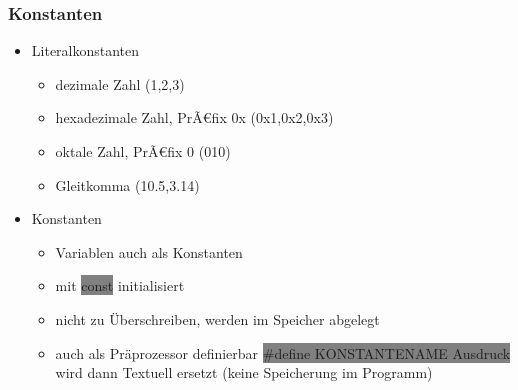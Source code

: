 \documentclass[10pt,a5paper]{article}
\newcommand{\cbg}[1]{\colorbox{grey}{#1}}
\begin{document}
\subsubsection{Konstanten}
\begin{itemize}
\item Literalkonstanten \begin{itemize}
\item dezimale Zahl (1,2,3)
\item hexadezimale Zahl, PrÃ€fix 0x (0x1,0x2,0x3)
\item oktale Zahl, PrÃ€fix 0 (010)
\item Gleitkomma (10.5,3.14)
\end{itemize}
\item Konstanten \begin{itemize}
\item Variablen auch als Konstanten
\item mit \cbg{const} initialisiert
\item nicht zu Überschreiben, werden im Speicher abgelegt
\item auch als Präprozessor definierbar \cbg{\#define KONSTANTENAME Ausdruck} wird dann Textuell ersetzt (keine Speicherung im Programm)

\end{itemize}
\end{itemize}
\end{document}
